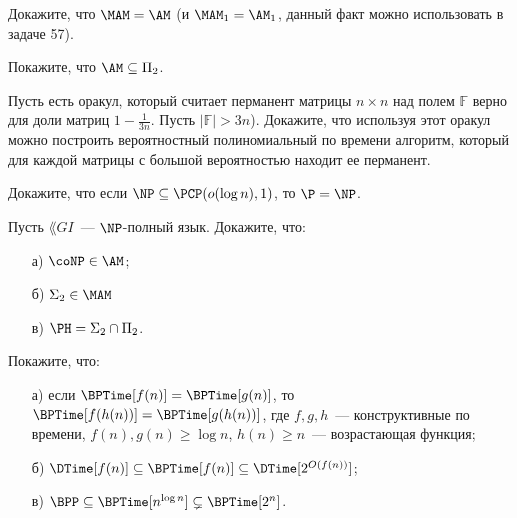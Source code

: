
\begin{task}
    Докажите, что $\MAM = \AM$ (и $\MAM_1 = \AM_1$, данный факт можно использовать в задаче 57).
\end{task}

\begin{task}
    Покажите, что $\AM \subseteq \Pi_2$.
\end{task}

\begin{task}
    Пусть есть оракул, который считает перманент матрицы $n \times n$ над полем $\mathbb{F}$ верно для доли матриц
    $1 - \frac{1}{3n}$. Пусть $|\mathbb{F}| > 3n$). Докажите, что используя этот оракул можно построить вероятностный
    полиномиальный по времени алгоритм, который для каждой матрицы с большой вероятностью находит ее перманент.
\end{task}

\begin{task}
	Докажите, что если $\NP \subseteq \PCP(o(\log n), 1)$, то $\P = \NP$.    
\end{task}


\begin{task}
    Пусть $\lang{GI}$~--- $\NP$-полный язык. Докажите, что:
    \begin{enumerate}[topsep = 0pt, itemsep = -1ex]
        \item [а)] $\coNP \in \AM$;
        \item [б)] $\Sigma_2 \in \MAM$
        \item [в)] $\PH = \Sigma_2 \cap \Pi_2$.
    \end{enumerate}
\end{task}


\breakline


\begin{ptask}{44}
    Покажите, что:
	\begin{enumerate}[topsep = 0pt, itemsep = -1ex]
        \item [а)] если $\BPTime[f(n)] = \BPTime[g(n)]$, то $\BPTime[f(h(n))] = \BPTime[g(h(n))]$, где $f, g, h$~---
			конструктивные по времени, $f(n), g(n) \ge \log n$, $h(n) \ge n$~--- возрастающая функция;
        \item [б)] $\DTime[f(n)] \subseteq \BPTime[f(n)] \subseteq \DTime[2^{O(f(n))}]$;
        \item [в)] $\BPP \subseteq \BPTime[n^{\log n}] \subsetneq \BPTime[2^n]$.
    \end{enumerate}
\end{ptask}

